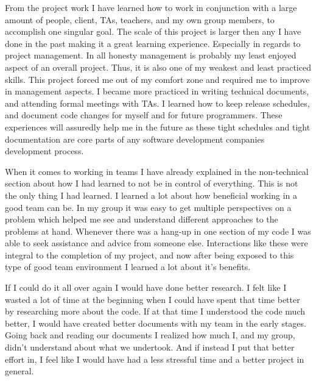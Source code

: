 \documentclass[10pt,journal,compsoc,draftclsnofoot]{IEEEtran}
\begin{document}
\begin{flushleft}
\vspace{3mm}
From the project work I have learned how to work in conjunction with a large amount of people, client, TAs, teachers, and my own group members, to accomplish one singular goal.
The scale of this project is larger then any I have done in the past making it a great learning experience.
Especially in regards to project management.
In all honesty management is probably my least enjoyed aspect of an overall project.
Thus, it is also one of my weakest and least practiced skills.
This project forced me out of my comfort zone and required me to improve in management aspects.
I became more practiced in writing technical documents, and attending formal meetings with TAs.
I learned how to keep release schedules, and document code changes for myself and for future programmers.
These experiences will assuredly help me in the future as these tight schedules and tight documentation are core parts of any software development companies development process.\par
When it comes to working in teams I have already explained in the non-technical section about how I had learned to not be in control of everything.
This is not the only thing I had learned.
I learned a lot about how beneficial working in a good team can be.
In my group it was easy to get multiple perspectives on a problem which helped me see and understand different approaches to the problems at hand.
Whenever there was a hang-up in one section of my code I was able to seek assistance and advice from someone else.
Interactions like these were integral to the completion of my project, and now after being exposed to this type of good team environment I learned a lot about it's benefits. \par
\vspace{3mm}
If I could do it all over again I would have done better research.
I felt like I wasted a lot of time at the beginning when I could have spent that time better by researching more about the code.
If at that time I understood the code much better, I would have created better documents with my team in the early stages.
Going back and reading our documents I realized how much I, and my group, didn't understand about what we undertook.
And if instead I put that better effort in, I feel like I would have had a less stressful time and a better project in general.

\end{flushleft}
\end{document}
